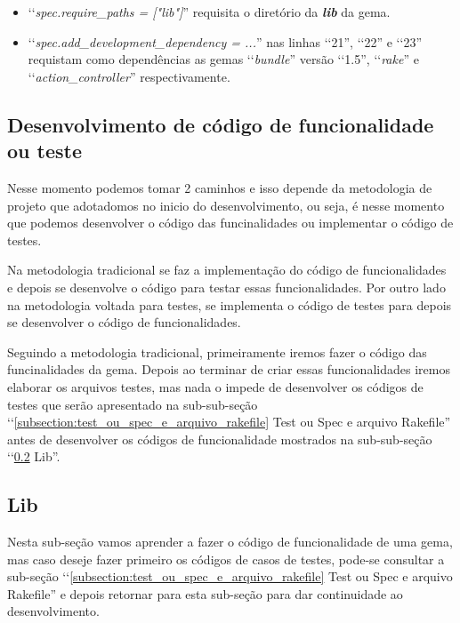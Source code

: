 \begin{itemize}
 \item ‘‘\emph{spec.require\_paths = ["lib"]}'' requisita o diretório da \emph{\textbf{lib}} da gema.
 
 \item ‘‘\emph{spec.add\_development\_dependency = ...}'' nas linhas ‘‘21'', ‘‘22'' e ‘‘23'' requistam como 
 dependências as gemas ‘‘\emph{bundle}'' versão ‘‘1.5'', ‘‘\emph{rake}'' e ‘‘\emph{action\_controller}''
 respectivamente.
 
\end{itemize}

\subsection{Desenvolvimento de código de funcionalidade ou teste}
\label{subsection:desenvolvimento_de_codigo_de_funcionalidade_ou_teste}

Nesse momento podemos tomar 2 caminhos e isso depende da metodologia de projeto que adotadomos no inicio 
do desenvolvimento, ou seja, é nesse momento que podemos desenvolver o código das funcinalidades
ou implementar o código de testes. 

Na metodologia tradicional se faz a implementação do código de funcionalidades e depois se
desenvolve o código para testar essas funcionalidades. Por outro lado na metodologia voltada para 
testes, se implementa o código de testes para depois se desenvolver o código de funcionalidades.

Seguindo a metodologia tradicional, primeiramente iremos fazer o código das funcinalidades da gema.
Depois ao terminar de criar essas funcionalidades iremos elaborar os arquivos testes, mas nada o impede
de desenvolver os códigos de testes que serão apresentado na sub-sub-seção 
‘‘\ref{subsection:test_ou_spec_e_arquivo_rakefile} Test ou Spec e arquivo Rakefile'' antes de 
desenvolver os códigos de funcionalidade mostrados na sub-sub-seção ‘‘\ref{subsection:lib} Lib''.

\subsection{Lib}
\label{subsection:lib}

Nesta sub-seção vamos aprender a fazer o código de funcionalidade de uma gema, mas caso deseje fazer 
primeiro os códigos de casos de testes, pode-se consultar a sub-seção 
‘‘\ref{subsection:test_ou_spec_e_arquivo_rakefile} Test ou Spec e arquivo Rakefile'' e depois retornar
para esta sub-seção para dar continuidade ao desenvolvimento.

